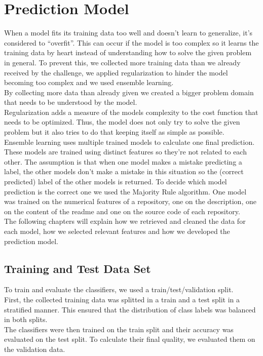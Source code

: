 \documentclass[%
a4paper,
DIV12,
2.5headlines,
bigheadings,
titlepage,
openbib,
]{scrartcl}
\begin{document}
\section{Prediction Model}\label{prediction-model}

When a model fits its training data too well and doesn't learn to generalize, it's considered to ``overfit''.
This can occur if the model is too complex so it learns the training data by heart instead of understanding how to solve the given problem in general.
To prevent this, we collected more training data than we already received by the challenge, we applied regularization to hinder the model becoming too complex and we used ensemble learning.\\
By collecting more data than already given we created a bigger problem domain that needs to be understood by the model.\\
Regularization adds a measure of the models complexity to the cost function that needs to be optimized.
Thus, the model does not only try to solve the given problem but it also tries to do that keeping itself as simple as possible.\\
Ensemble learning uses multiple trained models to calculate one final prediction.
These models are trained using distinct features so they're not related to each other.
The assumption is that when one model makes a mistake predicting a label, the other models don't make a mistake in this situation so the (correct predicted) label of the other models is returned.
To decide which model prediction is the correct one we used the Majority Rule algorithm.
One model was trained on the numerical features of a repository, one on the description, one on the content of the readme and one on the source code of each repository.\\
The following chapters will explain how we retrieved and cleaned the data for each model, how we selected relevant features and how we developed the prediction model.

\subsection{Training and Test Data
Set}\label{training-and-test-data-set}

To train and evaluate the classifiers, we used a train/test/validation split.\\
First, the collected training data was splitted in a train and a test split in a stratified manner.
This ensured that the distribution of class labels was balanced in both splits.\\
The classifiers were then trained on the train split and their accuracy was evaluated on the test split.
To calculate their final quality, we evaluated them on the validation data.
\end{document}
